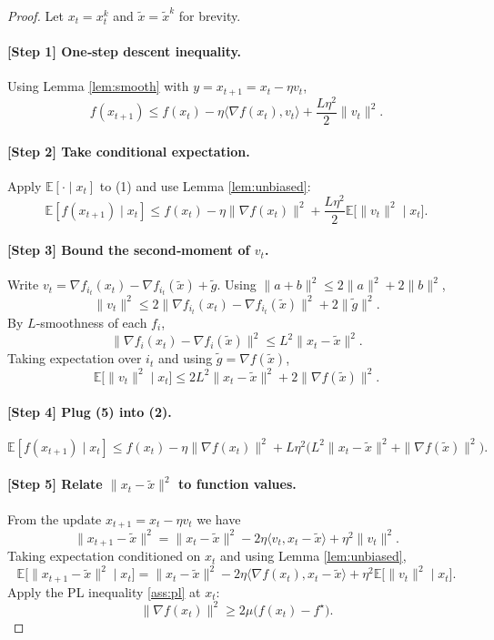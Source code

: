 \documentclass{article}
\begin{document}
\begin{proof}
Let $x_{t}=x_{t}^{k}$ and $\tilde{x}=\tilde{x}^{k}$ for brevity.  

\paragraph{[Step 1] One‑step descent inequality.}
Using Lemma \ref{lem:smooth} with $y=x_{t+1}=x_{t}-\eta v_{t}$,
\[
f(x_{t+1})\le f(x_{t})-\eta\langle\nabla f(x_{t}),v_{t}\rangle
+\frac{L\eta^{2}}{2}\|v_{t}\|^{2}. \tag{1}
\]

\paragraph{[Step 2] Take conditional expectation.}
Apply $\mathbb{E}[\cdot\mid x_{t}]$ to (1) and use Lemma \ref{lem:unbiased}:
\[
\mathbb{E}[f(x_{t+1})\mid x_{t}]
\le f(x_{t})-\eta\|\nabla f(x_{t})\|^{2}
+\frac{L\eta^{2}}{2}\mathbb{E}\!\big[\|v_{t}\|^{2}\mid x_{t}\big]. \tag{2}
\]

\paragraph{[Step 3] Bound the second‑moment of $v_{t}$.}
Write $v_{t}= \nabla f_{i_t}(x_{t})-\nabla f_{i_t}(\tilde{x})+\tilde{g}$.
Using $\|a+b\|^{2}\le 2\|a\|^{2}+2\|b\|^{2}$,
\[
\|v_{t}\|^{2}\le 2\|\nabla f_{i_t}(x_{t})-\nabla f_{i_t}(\tilde{x})\|^{2}
+2\|\tilde{g}\|^{2}. \tag{3}
\]
By $L$‑smoothness of each $f_i$,
\[
\|\nabla f_{i}(x_{t})-\nabla f_{i}(\tilde{x})\|^{2}
\le L^{2}\|x_{t}-\tilde{x}\|^{2}. \tag{4}
\]
Taking expectation over $i_t$ and using $\tilde{g}=\nabla f(\tilde{x})$,
\[
\mathbb{E}\!\big[\|v_{t}\|^{2}\mid x_{t}\big]
\le 2L^{2}\|x_{t}-\tilde{x}\|^{2}+2\|\nabla f(\tilde{x})\|^{2}. \tag{5}
\]

\paragraph{[Step 4] Plug (5) into (2).}
\[
\mathbb{E}[f(x_{t+1})\mid x_{t}]
\le f(x_{t})-\eta\|\nabla f(x_{t})\|^{2}
+L\eta^{2}\Big(L^{2}\|x_{t}-\tilde{x}\|^{2}
+\|\nabla f(\tilde{x})\|^{2}\Big). \tag{6}
\]

\paragraph{[Step 5] Relate $\|x_{t}-\tilde{x}\|^{2}$ to function values.}
From the update $x_{t+1}=x_{t}-\eta v_{t}$ we have
\[
\|x_{t+1}-\tilde{x}\|^{2}
= \|x_{t}-\tilde{x}\|^{2}-2\eta\langle v_{t},x_{t}-\tilde{x}\rangle+\eta^{2}\|v_{t}\|^{2}.
\]
Taking expectation conditioned on $x_{t}$ and using Lemma \ref{lem:unbiased},
\[
\mathbb{E}\!\big[\|x_{t+1}-\tilde{x}\|^{2}\mid x_{t}\big]
= \|x_{t}-\tilde{x}\|^{2}-2\eta\langle\nabla f(x_{t}),x_{t}-\tilde{x}\rangle
+\eta^{2}\mathbb{E}\!\big[\|v_{t}\|^{2}\mid x_{t}\big]. \tag{7}
\]
Apply the PL inequality \eqref{ass:pl} at $x_{t}$:
\[
\|\nabla f(x_{t})\|^{2}\ge 2\mu\big(f(x_{t})-f^{\star}\big). \tag{8}
\]


\end{proof}
\end{document}
